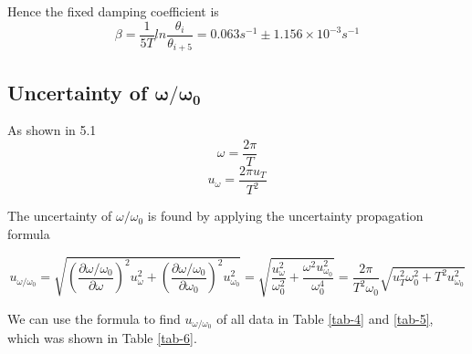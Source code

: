 \documentclass{article}
\begin{document}
Hence the fixed damping coefficient is
$$\beta=\frac{1}{5T}ln\frac{\theta_i}{\theta_{i+5}}=0.063s^{-1}\pm1.156\times10^{-3}s^{-1}$$

\newpage

\subsection{Uncertainty of $\bm{\omega/\omega_0}$}

As shown in 5.1
$$\omega=\frac{2\pi}{T}$$
$$u_{\omega}=\frac{2\pi u_T}{T^2}$$

The uncertainty of $\omega/\omega_0$ is found by applying the uncertainty propagation formula

$$u_{\omega/\omega_0}=\sqrt{\left(\frac{\partial\omega/\omega_0}{\partial\omega}\right)^2u_\omega^2+\left(\frac{\partial\omega/\omega_0}{\partial\omega_0}\right)^2u_{\omega_0}^2}
=\sqrt{\frac{u_\omega^2}{\omega_0^2}+\frac{\omega^2u_{\omega_0}^2}{\omega_0^4}}
=\frac{2\pi}{T^2\omega_0}\sqrt{u_T^2\omega_0^2+T^2u_{\omega_0}^2}$$

We can use the formula to find $u_{\omega/\omega_0}$ of all data in Table \ref{tab-4} and \ref{tab-5}, which was shown in Table \ref{tab-6}.
\end{document}
